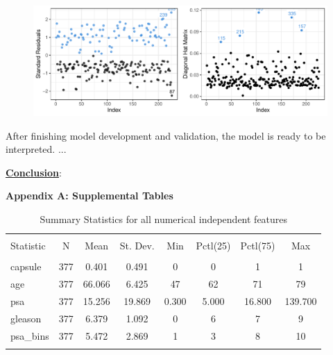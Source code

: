 \documentclass[11pt]{article}\usepackage[]{graphicx}\usepackage[]{color}
\makeatletter
\def\maxwidth{ %
  \ifdim\Gin@nat@width>\linewidth
    \linewidth
  \else
    \Gin@nat@width
  \fi
}
\makeatother
\begin{document}
\begin{figure}[h!] 
\begin{center}

\includegraphics[width=\maxwidth]{figure/unnamed-chunk-5-1} 

\caption{}
\label{model_plot_1}
\end{center} 
\end{figure}

\noindent After finishing model development and validation, the model is ready to be interpreted. ... 
\hfill \break

\noindent\textbf{\underline{Conclusion}}: 
\hfill \break

\clearpage
\newpage
\noindent \Large{{\bf Appendix A: Supplemental Tables}}

\begin{center}

\begin{table}[H] \centering 
  \caption{Summary Statistics for all numerical independent features} 
  \label{descrips} 
\begin{tabular}{@{\extracolsep{5pt}}lccccccc} 
\\[-1.8ex]\hline 
\hline \\[-1.8ex] 
Statistic & \multicolumn{1}{c}{N} & \multicolumn{1}{c}{Mean} & \multicolumn{1}{c}{St. Dev.} & \multicolumn{1}{c}{Min} & \multicolumn{1}{c}{Pctl(25)} & \multicolumn{1}{c}{Pctl(75)} & \multicolumn{1}{c}{Max} \\ 
\hline \\[-1.8ex] 
capsule & 377 & 0.401 & 0.491 & 0 & 0 & 1 & 1 \\ 
age & 377 & 66.066 & 6.425 & 47 & 62 & 71 & 79 \\ 
psa & 377 & 15.256 & 19.869 & 0.300 & 5.000 & 16.800 & 139.700 \\ 
gleason & 377 & 6.379 & 1.092 & 0 & 6 & 7 & 9 \\ 
psa\_bins & 377 & 5.472 & 2.869 & 1 & 3 & 8 & 10 \\ 
\hline \\[-1.8ex] 
\end{tabular} 
\end{table} 

\end{center} 
\end{document}
